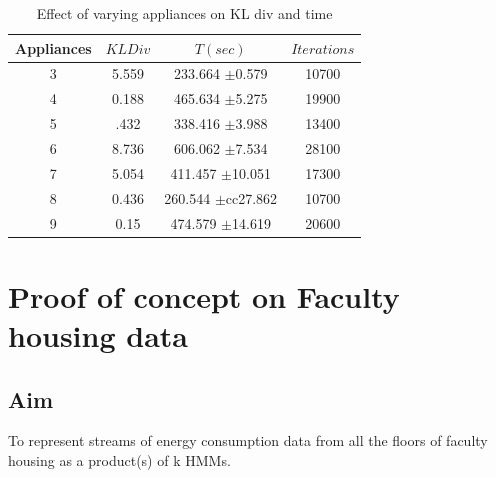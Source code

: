 \documentclass[10pt, conference, compsocconf]{IEEEtran}
\begin{document}
\begin{table}[htdp]
\begin{center}
\begin{tabular}{| c | c | c | c |}
\hline
Appliances & $KL Div$ & $T(sec)$ & $Iterations$ \\
\hline
3 & 5.559 & 233.664 $\pm$0.579 & 10700 \\
4 & 0.188 & 465.634 $\pm$5.275 & 19900 \\
5 & .432 & 338.416 $\pm$3.988  & 13400 \\
6 & 8.736 & 606.062 $\pm$7.534 & 28100 \\
7 & 5.054 & 411.457 $\pm$10.051 & 17300 \\
8 & 0.436 & 260.544 $\pm$cc27.862 & 10700 \\
9 & 0.15 & 474.579 $\pm$14.619 & 20600 \\
\hline
\end{tabular}
\end{center}
\caption{Effect of varying appliances on KL div and time}
\label{table: error}
\end{table}

\section{Proof of concept on Faculty housing data}

\subsection{ Aim } To represent streams of energy consumption data from all the floors of faculty housing as a product(s) of k HMMs. 
\end{document}
